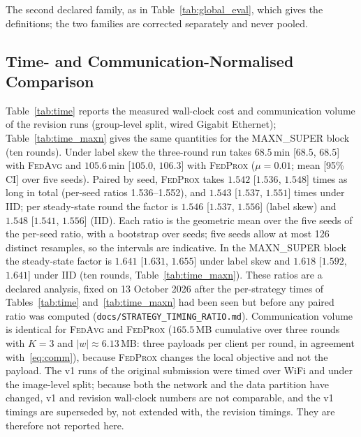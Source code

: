 \documentclass[journal]{IEEEtran}
\newcommand{\fedavg}{\textsc{FedAvg}}
\newcommand{\fedprox}{\textsc{FedProx}}
\begin{document}
\begin{table}[t]
\centering
\caption{Global Evaluation, MAXN\_SUPER Block: Federated Strategy Minus Local-Only Reference on the Union of the Test Splits (Balanced Accuracy, Seed-Paired, Sequence Bootstrap $B=10{,}000$)}
\label{tab:global_eval_maxn}
\setlength{\tabcolsep}{2pt}
{\footnotesize
}
\vspace{2pt}
\parbox{\textwidth}{\footnotesize The second declared family, as in Table~\ref{tab:global_eval}, which gives the definitions; the two families are corrected separately and never pooled.}
\end{table}

\subsection{Time- and Communication-Normalised Comparison}
\label{sec:res_time}

Table~\ref{tab:time} reports the measured wall-clock cost and communication volume of the revision runs (group-level split, wired Gigabit Ethernet); Table~\ref{tab:time_maxn} gives the same quantities for the MAXN\_SUPER block (ten rounds). Under label skew the three-round run takes $68.5$\,min [$68.5$, $68.5$] with \fedavg{} and $105.6$\,min [$105.0$, $106.3$] with \fedprox{} ($\mu=0.01$; mean [95\% CI] over five seeds). Paired by seed, \fedprox{} takes $1.542$ [$1.536$, $1.548$] times as long in total (per-seed ratios 1.536--1.552), and $1.543$ [$1.537$, $1.551$] times under IID; per steady-state round the factor is $1.546$ [$1.537$, $1.556$] (label skew) and $1.548$ [$1.541$, $1.556$] (IID). Each ratio is the geometric mean over the five seeds of the per-seed ratio, with a bootstrap over seeds; five seeds allow at most 126 distinct resamples, so the intervals are indicative. In the MAXN\_SUPER block the steady-state factor is $1.641$ [$1.631$, $1.655$] under label skew and $1.618$ [$1.592$, $1.641$] under IID (ten rounds, Table~\ref{tab:time_maxn}). These ratios are a declared analysis, fixed on 13 October 2026 after the per-strategy times of Tables~\ref{tab:time} and~\ref{tab:time_maxn} had been seen but before any paired ratio was computed (\texttt{docs/STRATEGY\_TIMING\_RATIO.md}). Communication volume is identical for \fedavg{} and \fedprox{} ($165.5$\,MB cumulative over three rounds with $K=3$ and $|w| \approx 6.13$\,MB: three payloads per client per round, in agreement with~\eqref{eq:comm}), because \fedprox{} changes the local objective and not the payload. The v1 runs of the original submission were timed over WiFi and under the image-level split; because both the network and the data partition have changed, v1 and revision wall-clock numbers are not comparable, and the v1 timings are superseded by, not extended with, the revision timings. They are therefore not reported here.
\end{document}
